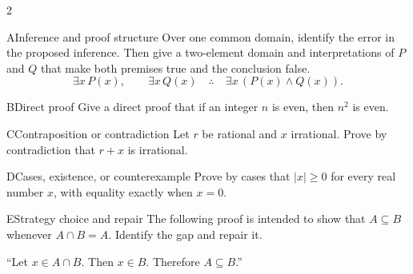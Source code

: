 \documentclass[9pt]{extarticle}
\begin{document}
\begin{multicols}{2}
\begin{CoreProblem}{A}{Inference and proof structure}
Over one common domain, identify the error in the proposed inference. Then give
a two-element domain and interpretations of $P$ and $Q$ that make both premises
true and the conclusion false.
\[
\exists x\,P(x),\qquad \exists x\,Q(x)
\quad\therefore\quad
\exists x\,(P(x)\land Q(x)).
\]
\end{CoreProblem}
\begin{CoreProblem}{B}{Direct proof}
Give a direct proof that if an integer $n$ is even, then $n^2$ is even.
\end{CoreProblem}
\begin{CoreProblem}{C}{Contraposition or contradiction}
Let $r$ be rational and $x$ irrational. Prove by contradiction that $r+x$ is irrational.
\end{CoreProblem}
\columnbreak
\begin{CoreProblem}{D}{Cases, existence, or counterexample}
Prove by cases that $|x|\ge 0$ for every real number $x$, with equality exactly when $x=0$.
\end{CoreProblem}
\begin{CoreProblem}{E}{Strategy choice and repair}
The following proof is intended to show that $A\subseteq B$ whenever
$A\cap B=A$. Identify the gap and repair it.

``Let $x\in A\cap B$. Then $x\in B$. Therefore $A\subseteq B$.''
\end{CoreProblem}
\end{multicols}
\CoreWorkArea
\FormBreak
{}
\end{document}
